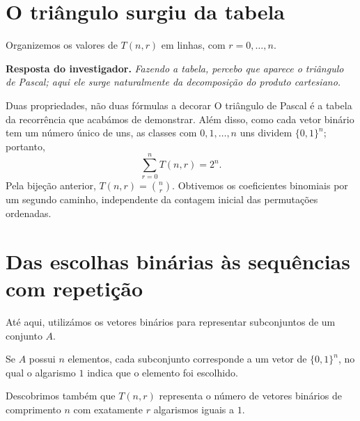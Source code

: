 \documentclass[11pt,a4paper,oneside]{book}
\newcommand{\Resposta}[1]{\textcolor{verdeescuro}{\textbf{Resposta do investigador.}} \emph{#1}\par}
\begin{document}
\section{O triângulo surgiu da tabela}
Organizemos os valores de $T(n,r)$ em linhas, com $r=0,\ldots,n$.
\begin{center}
\end{center}
\Resposta{Fazendo a tabela, percebo que aparece o triângulo de Pascal; aqui ele surge naturalmente da decomposição do produto cartesiano.}
\begin{descobertabox}{Duas propriedades, não duas fórmulas a decorar}
O triângulo de Pascal é a tabela da recorrência que acabámos de demonstrar. Além disso, como cada vetor binário tem um número único de uns, as classes com $0,1,\ldots,n$ uns dividem $\{0,1\}^n$; portanto,
\[\boxed{\sum_{r=0}^n T(n,r)=2^n}.\]
Pela bijeção anterior, $T(n,r)=\binom nr$. Obtivemos os coeficientes binomiais por um segundo caminho, independente da contagem inicial das permutações ordenadas.
\end{descobertabox}


\section*{Das escolhas binárias às sequências com repetição}

Até aqui, utilizámos os vetores binários para representar
subconjuntos de um conjunto $A$.

Se $A$ possui $n$ elementos, cada subconjunto corresponde
a um vetor de $\{0,1\}^n$, no qual o algarismo $1$
indica que o elemento foi escolhido.

Descobrimos também que $T(n,r)$ representa o número
de vetores binários de comprimento $n$ com exatamente
$r$ algarismos iguais a $1$.
\end{document}
